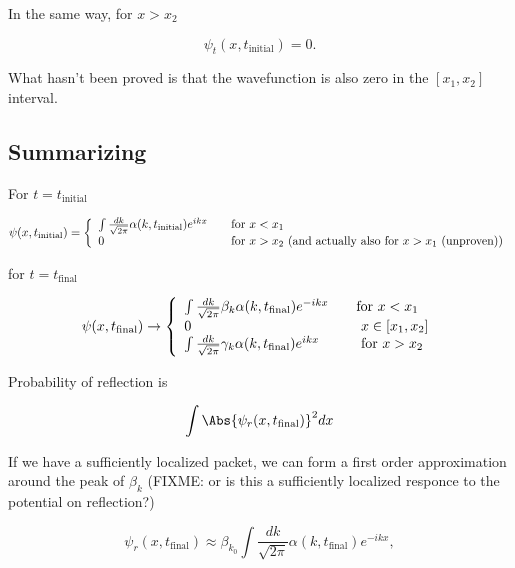 In the same way, for $x > x_2$

\begin{equation}\label{eqn:qmTwoL22:330}
\psi_t(x, t_{\text{initial}}) = 0.
\end{equation}

What hasn't been proved is that the wavefunction is also zero in the $[x_1, x_2]$ interval.

\subsection{Summarizing}

For $t = t_{\text{initial}}$

\begin{equation}\label{eqn:qmTwoL22:350}
\psi(x, t_{\text{initial}})
=
\left\{
\begin{array}{l l}
\int \frac{dk}{\sqrt{2 \pi}} \alpha(k, t_{\text{initial}}) e^{i k x} &\quad \mbox{for $x < x_1$} \\
0 & \quad \mbox{for $x > x_2$ (and actually also for $x > x_1$ (unproven))}
\end{array}
\right.
\end{equation}

for $t = t_{\text{final}}$

\begin{equation}\label{eqn:qmTwoL22:370}
\psi(x, t_{\text{final}})
\rightarrow
\left\{
\begin{array}{l l}
\int \frac{dk}{\sqrt{2 \pi}} \beta_k \alpha(k, t_{\text{final}}) e^{-i k x} &\quad \mbox{for $x < x_1$} \\
0 & \quad \mbox{ $x \in [x_1, x_2]$} \\
\int \frac{dk}{\sqrt{2 \pi}} \gamma_k \alpha(k, t_{\text{final}}) e^{i k x}
 & \quad \mbox{ for $x > x_2$ }
\end{array}
\right.
\end{equation}

Probability of reflection is

\begin{equation}\label{eqn:qmTwoL22:390}
\int \Abs{\psi_r(x, t_{\text{final}})}^2 dx
\end{equation}

If we have a sufficiently localized packet, we can form a first order approximation around the peak of $\beta_k$ (FIXME: or is this a sufficiently localized responce to the potential on reflection?)

\begin{equation}\label{eqn:qmTwoL22:410}
\psi_r(x, t_{\text{final}}) \approx \beta_{k_0}
\int \frac{dk}{\sqrt{2 \pi}} \alpha(k, t_{\text{final}}) e^{-i k x},
\end{equation}


